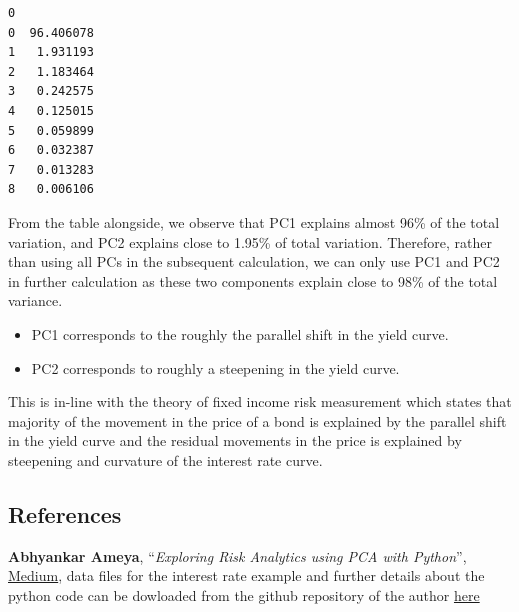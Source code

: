 \documentclass[11pt]{article}
\makeatletter
\providecommand{\tightlist}{%
      \setlength{\itemsep}{0pt}\setlength{\parskip}{0pt}}
\newcommand{\boxspacing}{\kern\kvtcb@left@rule\kern\kvtcb@boxsep}
\newcommand{\prompt}[4]{
        {\ttfamily\llap{{\color{#2}[#3]:\hspace{3pt}#4}}\vspace{-\baselineskip}}
    }
\makeatother
\begin{document}
            \begin{tcolorbox}[breakable, size=fbox, boxrule=.5pt, pad at break*=1mm, opacityfill=0]
\prompt{Out}{outcolor}{22}{\boxspacing}
\begin{Verbatim}[commandchars=\\\{\}]
           0
0  96.406078
1   1.931193
2   1.183464
3   0.242575
4   0.125015
5   0.059899
6   0.032387
7   0.013283
8   0.006106
\end{Verbatim}
\end{tcolorbox}
        
    From the table alongside, we observe that PC1 explains almost 96\% of
the total variation, and PC2 explains close to 1.95\% of total
variation. Therefore, rather than using all PCs in the subsequent
calculation, we can only use PC1 and PC2 in further calculation as these
two components explain close to 98\% of the total variance.

\begin{itemize}
\tightlist
\item
  PC1 corresponds to the roughly the parallel shift in the yield curve.
\item
  PC2 corresponds to roughly a steepening in the yield curve.
\end{itemize}

This is in-line with the theory of fixed income risk measurement which
states that majority of the movement in the price of a bond is explained
by the parallel shift in the yield curve and the residual movements in
the price is explained by steepening and curvature of the interest rate
curve.

    \hypertarget{references}{%
\subsection{References}\label{references}}

    \textbf{Abhyankar Ameya}, ``\emph{Exploring Risk Analytics using PCA
with Python}'',
\href{https://abhyankar-ameya.medium.com/exploring-risk-analytics-using-pca-with-python-3aca369cbfe4}{Medium},
data files for the interest rate example and further details about the
python code can be dowloaded from the github repository of the author
\href{https://github.com/Ameya1983/TheAlchemist}{here}


    
    
    
\end{document}
